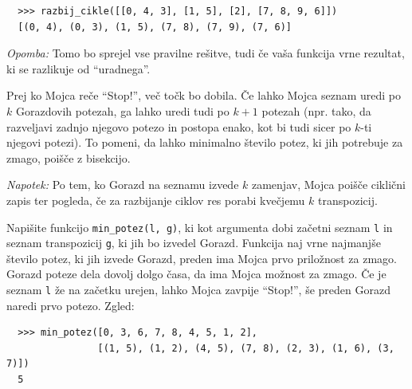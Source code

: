 \documentclass[arhiv]{../izpit}
\begin{document}
\begin{verbatim}
  >>> razbij_cikle([[0, 4, 3], [1, 5], [2], [7, 8, 9, 6]])
  [(0, 4), (0, 3), (1, 5), (7, 8), (7, 9), (7, 6)]
\end{verbatim}

\noindent \emph{Opomba:} Tomo bo sprejel vse pravilne rešitve, tudi če vaša funkcija vrne rezultat, ki se razlikuje od ``uradnega''.

\podnaloga[10 točk]
Prej ko Mojca reče ``Stop!'', več točk bo dobila. Če lahko Mojca seznam uredi po $k$ Gorazdovih potezah, ga lahko uredi tudi po $k + 1$ potezah (npr. tako, da razveljavi zadnjo njegovo potezo in postopa enako, kot bi tudi sicer po $k$-ti njegovi potezi). To pomeni, da lahko minimalno število potez, ki jih potrebuje za zmago, poišče z bisekcijo.

\emph{Napotek:} Po tem, ko Gorazd na seznamu izvede $k$ zamenjav, Mojca poišče ciklični zapis ter pogleda, če za razbijanje ciklov res porabi kvečjemu $k$ transpozicij.

Napišite funkcijo \texttt{min\_potez(l, g)}, ki kot argumenta dobi začetni seznam \texttt{l} in seznam trans\-pozicij \texttt{g}, ki jih bo izvedel Gorazd. Funkcija naj vrne najmanjše število potez, ki jih izvede Gorazd, preden ima Mojca prvo priložnost za zmago. Gorazd poteze dela dovolj dolgo časa, da ima Mojca možnost za zmago. Če je seznam \texttt{l} že na začetku urejen, lahko Mojca zavpije ``Stop!'', še preden Gorazd naredi prvo potezo. Zgled:

\begin{verbatim}
  >>> min_potez([0, 3, 6, 7, 8, 4, 5, 1, 2],
                [(1, 5), (1, 2), (4, 5), (7, 8), (2, 3), (1, 6), (3, 7)])
  5
\end{verbatim}
\end{document}
